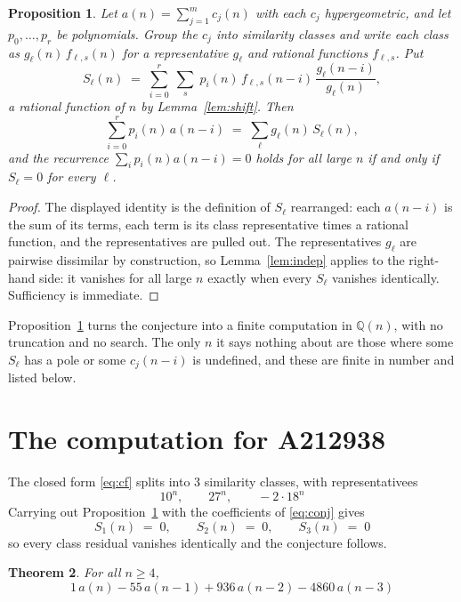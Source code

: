 \documentclass[11pt,a4paper]{article}
\theoremstyle{plain}
\newtheorem{theorem}{Theorem}
\newtheorem{proposition}[theorem]{Proposition}
\theoremstyle{definition}
\begin{document}
\begin{proposition}\label{prop:main}
Let $a(n)=\sum_{j=1}^{m}c_{j}(n)$ with each $c_{j}$ hypergeometric, and let
$p_{0},\dots,p_{r}$ be polynomials. Group the $c_{j}$ into similarity classes and write
each class as $g_{\ell}(n)\,f_{\ell,s}(n)$ for a representative $g_{\ell}$ and rational
functions $f_{\ell,s}$. Put
\[
S_{\ell}(n)\;=\;\sum_{i=0}^{r}\;\sum_{s}\;p_{i}(n)\,f_{\ell,s}(n-i)\,
\frac{g_{\ell}(n-i)}{g_{\ell}(n)} ,
\]
a rational function of $n$ by Lemma~\ref{lem:shift}. Then
\[
\sum_{i=0}^{r}p_{i}(n)\,a(n-i)\;=\;\sum_{\ell}g_{\ell}(n)\,S_{\ell}(n),
\]
and the recurrence $\sum_{i}p_{i}(n)a(n-i)=0$ holds for all large $n$ if and only if
$S_{\ell}=0$ for every $\ell$.
\end{proposition}

\begin{proof}
The displayed identity is the definition of $S_{\ell}$ rearranged: each $a(n-i)$ is the
sum of its terms, each term is its class representative times a rational function, and the
representatives are pulled out. The representatives $g_{\ell}$ are pairwise dissimilar by
construction, so Lemma~\ref{lem:indep} applies to the right-hand side: it vanishes for all
large $n$ exactly when every $S_{\ell}$ vanishes identically. Sufficiency is immediate.
\end{proof}

Proposition~\ref{prop:main} turns the conjecture into a finite computation in
$\mathbb{Q}(n)$, with no truncation and no search. The only $n$ it says nothing about are
those where some $S_{\ell}$ has a pole or some $c_{j}(n-i)$ is undefined, and these are
finite in number and listed below.

\section{The computation for A212938}

The closed form \eqref{eq:cf} splits into 3 similarity classes, with
representativees
\[
10^{n},\qquad 27^{n},\qquad - 2 \cdot 18^{n}
\]
Carrying out Proposition~\ref{prop:main} with the coefficients of \eqref{eq:conj} gives
\[
S_{1}(n)\;=\;0,\qquad S_{2}(n)\;=\;0,\qquad S_{3}(n)\;=\;0
\]
so every class residual vanishes identically and the conjecture follows.

\begin{theorem}
For all $n\ge 4$,
\[
1\,a(n) - 55\,a(n-1) + 936\,a(n-2) - 4860\,a(n-3)
\]
\end{theorem}
\end{document}
